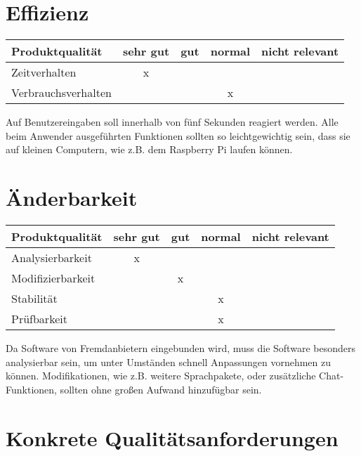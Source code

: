 \section{Effizienz}
\begin{tabular}{|l|c|c|c|c|}
	\hline
	\textbf{Produktqualität} & \textbf{sehr gut} & \textbf{gut} & \textbf{normal} & \textbf{nicht relevant} \\ \hline
	Zeitverhalten            &          x        &              &                 &                         \\ \hline
	Verbrauchsverhalten      &                   &              &        x        &                         \\ \hline
\end{tabular}

Auf Benutzereingaben soll innerhalb von fünf Sekunden reagiert werden.
Alle beim Anwender ausgeführten Funktionen sollten so leichtgewichtig sein, dass sie auf kleinen Computern, wie z.B. dem Raspberry Pi laufen können.

\section{Änderbarkeit}
\begin{tabular}{|l|c|c|c|c|}
	\hline
	\textbf{Produktqualität} & \textbf{sehr gut} & \textbf{gut} & \textbf{normal} & \textbf{nicht relevant} \\ \hline
	Analysierbarkeit         &         x         &              &                 &                         \\ \hline
	Modifizierbarkeit        &                   &      x       &                 &                         \\ \hline
	Stabilität               &                   &              &         x       &                         \\ \hline
	Prüfbarkeit              &                   &              &         x       &                         \\ \hline
\end{tabular}

Da Software von Fremdanbietern eingebunden wird, muss die Software besonders analysierbar sein, 
um unter Umständen schnell Anpassungen vornehmen zu können.
Modifikationen, wie z.B. weitere Sprachpakete, oder zusätzliche Chat-Funktionen, sollten ohne großen Aufwand hinzufügbar sein.

\pagebreak[4]

\section{Konkrete Qualitätsanforderungen}


